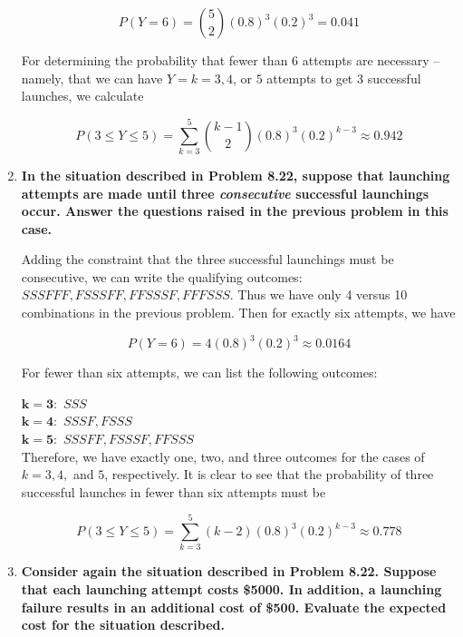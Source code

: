 \documentclass[10pt, oneside]{article}   	%
\theoremstyle{definition}
\begin{document}
\begin{enumerate}[label=8.\arabic*]
\[ P(Y = 6) = \binom{5}{2} (0.8)^3 (0.2)^3 = \boxed{0.041} \]

For determining the probability that fewer than 6 attempts are necessary -- namely, that we can have $Y = k = 3, 4$, or $5$ attempts to get 3 successful launches, we calculate

\[ P(3 \leq Y \leq 5) = \sum^5_{k=3} \binom{k-1}{2} (0.8)^3 (0.2)^{k-3} \approx \boxed{0.942} \]

\item  \begin{tcolorbox}[
  colback=Cerulean!5!white,
  colframe=Cerulean!75!black]
\textbf{In the situation described in Problem 8.22, suppose that launching attempts are made until three \textit{consecutive} successful launchings occur. Answer the questions raised in the previous problem in this case.}
\end{tcolorbox}

Adding the constraint that the three successful launchings must be consecutive, we can write the qualifying outcomes: $SSSFFF, FSSSFF, FFSSSF, FFFSSS$. Thus we have only 4 versus 10 combinations in the previous problem. Then for exactly six attempts, we have

\[ P(Y = 6) = 4(0.8)^3 (0.2)^3 \approx \boxed{0.0164} \]

For fewer than six attempts, we can list the following outcomes:

\textbf{$\bm{k = 3:}$} $SSS$ \\
\textbf{$\bm{k = 4:}$} $SSSF, FSSS$  \\
\textbf{$\bm{k = 5:}$} $SSSFF, FSSSF, FFSSS$ \\

Therefore, we have exactly one, two, and three outcomes for the cases of $k = 3, 4,$ and $5$, respectively. It is clear to see that the probability of three successful launches in fewer than six attempts must be

\[ P(3 \leq Y \leq 5) = \sum^5_{k=3} (k-2) (0.8)^3 (0.2)^{k-3} \approx \boxed{0.778} \]

\item  \begin{tcolorbox}[
  colback=Cerulean!5!white,
  colframe=Cerulean!75!black]
\textbf{Consider again the situation described in Problem 8.22. Suppose that each launching attempt costs \$5000. In addition, a launching failure results in an additional cost of \$500. Evaluate the expected cost for the situation described.}
\end{tcolorbox}


\end{enumerate}
\end{document}
